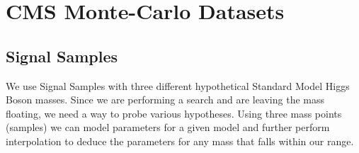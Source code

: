\section{CMS Monte-Carlo Datasets} \label{section:higgs_mc}


\subsection{Signal Samples} \label{subsection:higgs_mc_signal}
We use Signal Samples with three different hypothetical Standard Model Higgs Boson masses. Since we are performing a search and are leaving the mass floating, we need a way to probe various hypotheses. Using three mass points (samples) we can model parameters for a given model and further perform interpolation to deduce the parameters for any mass that falls within our range.

